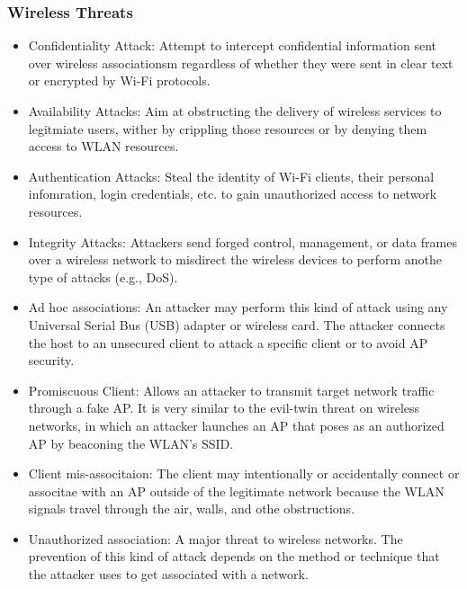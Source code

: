 \subsubsection{Wireless Threats}
\begin{itemize}
    \item Confidentiality Attack: Attempt to intercept confidential information sent over wireless associationsm regardless of whether they were sent in clear text or encrypted by Wi-Fi protocols.
    \item Availability Attacks: Aim at obstructing the delivery of wireless services to legitmiate users, wither by crippling those resources or by denying them access to WLAN resources.
    \item Authentication Attacks: Steal the identity of Wi-Fi clients, their personal infomration, login credentials, etc. to gain unauthorized access to network resources.
    \item Integrity Attacks: Attackers send forged control, management, or data frames over a wireless network to misdirect the wireless devices to perform anothe type of attacks (e.g., DoS).
    \item Ad hoc associations: An attacker may perform this kind of attack using any Universal Serial Bus (USB) adapter or wireless card. The attacker connects the host to an unsecured client to attack a specific client or to avoid AP security.
    \item Promiscuous Client: Allows an attacker to transmit target network traffic through a fake AP. It is very similar to the evil-twin threat on wireless networks, in which an attacker launches an AP that poses as an authorized AP by beaconing the WLAN's SSID.
    \item Client mis-associtaion: The client may intentionally or accidentally connect or associtae with an AP outside of the legitimate network because the WLAN signals travel through the air, walls, and othe obstructions.
    \item Unauthorized association: A major threat to wireless networks. The prevention of this kind of attack depends on the method or technique that the attacker uses to get associated with a network.
\end{itemize}
